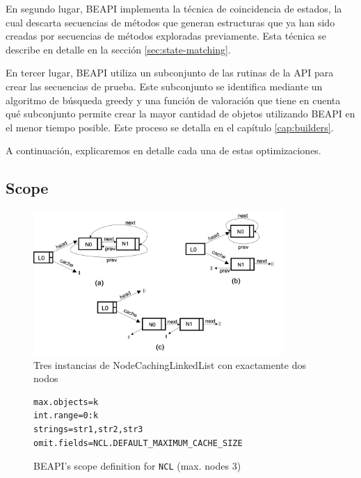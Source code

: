 En segundo lugar, \textsf{BEAPI} implementa la técnica de coincidencia de estados, la cual descarta secuencias de métodos que generan estructuras que ya han sido creadas por secuencias de métodos exploradas previamente. Esta técnica se describe en detalle en la sección \ref{sec:state-matching}.

En tercer lugar, \textsf{BEAPI} utiliza un subconjunto de las rutinas de la API para crear las secuencias de prueba.
Este subconjunto se identifica mediante un algoritmo de búsqueda greedy y una función de valoración que tiene en cuenta qué subconjunto permite crear la mayor cantidad de objetos utilizando \textsf{BEAPI} en el menor tiempo posible. Este proceso se detalla en el capítulo \ref{cap:builders}.

A continuación, explicaremos en detalle cada una de estas optimizaciones.

\subsection{Scope}
\label{sec:scope}

\begin{figure}[H]
    \centering
    \includegraphics[width=0.85\textwidth]{images/NCL-instances.png}
    \caption{Tres instancias de NodeCachingLinkedList con exactamente dos nodos}
    \label{fig:ncl-instances}
\end{figure}

\begin{figure}[H]
\begin{lstlisting}[keywordstyle=\scriptsize\ttfamily]
max.objects=k
int.range=0:k
strings=str1,str2,str3
omit.fields=NCL.DEFAULT_MAXIMUM_CACHE_SIZE
\end{lstlisting}
\caption{\textsf{BEAPI}'s scope definition for \texttt{NCL} (max. nodes 3)}
\label{fig:NCL-fin-BEAPI}
\end{figure}


